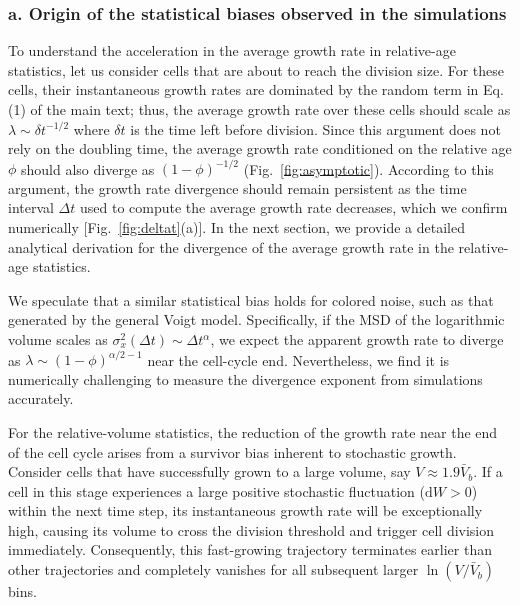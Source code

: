 \documentclass[aps, prl, longbibliography, linenumbers, superscriptaddress]{revtex4-2}
\begin{document}
\subsubsection{a. Origin of the statistical biases observed in the simulations}
To understand the acceleration in the average growth rate in relative-age statistics, let us consider cells that are about to reach the division size. For these cells, their instantaneous growth rates are dominated by the random term in Eq. (1) of the main text; thus, the average growth rate over these cells should scale as $\lambda\sim \delta t^{-1/2}$ where $\delta t$ is the time left before division. Since this argument does not rely on the doubling time, the average growth rate conditioned on the relative age $\phi$ should also diverge as $(1-\phi)^{-1/2}$ (Fig.~\ref{fig:asymptotic}). According to this argument, the growth rate divergence should remain persistent as the time interval $\Delta t$ used to compute the average growth rate decreases, which we confirm numerically [Fig.~\ref{fig:deltat}(a)]. In the next section, we provide a detailed analytical derivation for the divergence of the average growth rate in the relative-age statistics.
	
We speculate that a similar statistical bias holds for colored noise, such as that generated by the general Voigt model. Specifically, if the MSD of the logarithmic volume scales as $\sigma_x^2(\Delta t) \sim \Delta t^{\alpha}$, we expect the apparent growth rate to diverge as $\lambda \sim (1-\phi)^{\alpha/2-1}$ near the cell-cycle end. Nevertheless, we find it is numerically challenging to measure the divergence exponent from simulations accurately.

For the relative-volume statistics, the reduction of the growth rate near the end of the cell cycle arises from a survivor bias inherent to stochastic growth. Consider cells that have successfully grown to a large volume, say $V \approx 1.9\bar{V}_b$. If a cell in this stage experiences a large positive stochastic fluctuation ($\mathrm{d}W > 0$) within the next time step, its instantaneous growth rate will be exceptionally high, causing its volume to cross the division threshold and trigger cell division immediately. Consequently, this fast-growing trajectory terminates earlier than other trajectories and completely vanishes for all subsequent larger $\ln(V/\bar{V}_b)$ bins. 
	
\end{document}

